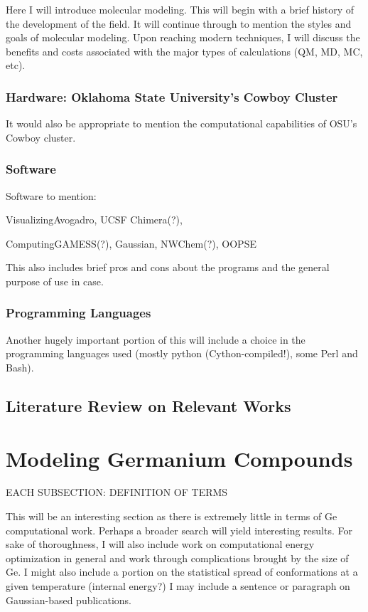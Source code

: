 Here I will introduce molecular modeling. This will begin with a brief history of the development of the field. It will continue through to mention the styles and goals of molecular modeling. Upon reaching modern techniques, I will discuss the benefits and costs associated with the major types of calculations (QM, MD, MC, etc). 

\subsubsection{Hardware: Oklahoma State University's Cowboy Cluster}

It would also be appropriate to mention the computational capabilities of OSU's Cowboy cluster.

\subsubsection{Software}

Software to mention: 

Visualizing{Avogadro, UCSF Chimera(?)}, 

Computing{GAMESS(?), Gaussian, NWChem(?), OOPSE}

This also includes brief pros and cons about the programs and the general purpose of use in case.

\subsubsection{Programming Languages}

Another hugely important portion of this will include a choice in the programming languages used (mostly python (Cython-compiled!), some Perl and Bash).

\subsection{Literature Review on Relevant Works}

\section{Modeling Germanium Compounds}

EACH SUBSECTION: DEFINITION OF TERMS

This will be an interesting section as there is extremely little in terms of Ge computational work. Perhaps a broader search will yield interesting results. For sake of thoroughness, I will also include work on computational energy optimization in general and work through complications brought by the size of Ge. I might also include a portion on the statistical spread of conformations at a given temperature (internal energy?) I may include a sentence or paragraph on Gaussian-based publications. 

